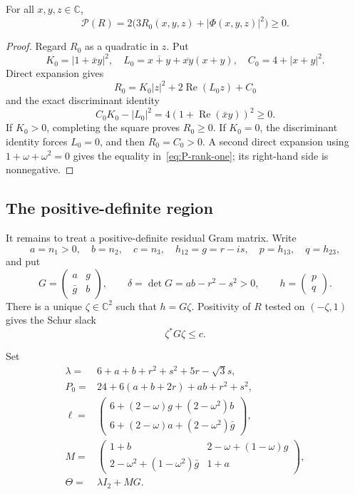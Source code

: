 \documentclass[10pt,twoside]{siamart1116}
\newcommand{\CC}{\mathbb C}
\newcommand{\Rea}{\operatorname{Re}}
\newcommand{\mat}[1]{\begin{pmatrix}#1\end{pmatrix}}
\begin{document}
\begin{lemma}\label{lem:rank-one-sos}
For all $x,y,z\in\CC$,
\begin{equation}\label{eq:P-rank-one}
 \mathcal P(R)=2\bigl(3R_0(x,y,z)+|\Phi(x,y,z)|^2\bigr)\geq0.
\end{equation}
\end{lemma}

\begin{proof}
Regard $R_0$ as a quadratic in $z$.  Put
\[
 K_0=|1+\bar xy|^2,\quad
 L_0=\overline{x+y}+\overline{xy}(x+y),\quad
 C_0=4+|x+y|^2.
\]
Direct expansion gives
\[
 R_0=K_0|z|^2+2\Rea(L_0z)+C_0
\]
and the exact discriminant identity
\[
 C_0K_0-|L_0|^2=4(1+\Rea(\bar xy))^2\geq0.
\]
If $K_0>0$, completing the square proves $R_0\geq0$.  If $K_0=0$, the
discriminant identity forces $L_0=0$, and then $R_0=C_0>0$.  A second direct
expansion using $1+\omega+\omega^2=0$ gives the equality
in~\eqref{eq:P-rank-one}; its right-hand side is nonnegative.
\end{proof}

\subsection{The positive-definite region}

It remains to treat a positive-definite residual Gram matrix.  Write
\begin{equation}\label{eq:G-data}
 a=n_1>0,\quad b=n_2,\quad c=n_3,\quad
 h_{12}=g=r-is,\quad p=h_{13},\quad q=h_{23},
\end{equation}
and put
\begin{equation}\label{eq:Gram-G-delta}
 G=\mat{a&g\\\bar g&b},\qquad
 \delta=\det G=ab-r^2-s^2>0,\qquad h=\mat{p\\q}.
\end{equation}
There is a unique $\zeta\in\CC^2$ such that $h=G\zeta$.  Positivity of
$R$ tested on $(-\zeta,1)$ gives the Schur slack
\begin{equation}\label{eq:schur-slack}
 \zeta^*G\zeta\leq c.
\end{equation}

Set
\begin{align}
 \lambda={}&6+a+b+r^2+s^2+5r-\sqrt3s,\label{eq:lambda}\\
 P_0={}&24+6(a+b+2r)+ab+r^2+s^2,\label{eq:P0}\\
 \ell={}&\mat{
 6+(2-\omega)g+(2-\omega^2)b\\
 6+(2-\omega)a+(2-\omega^2)\bar g},\label{eq:ell}\\
 M={}&\mat{
 1+b&2-\omega+(1-\omega)g\\
 2-\omega^2+(1-\omega^2)\bar g&1+a},\label{eq:M}\\
 \Theta={}&\lambda I_2+MG.\label{eq:Theta-matrix}
\end{align}
\end{document}
